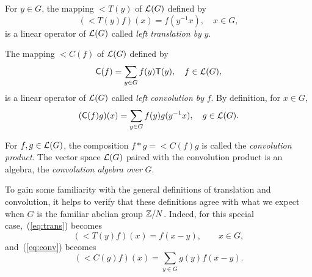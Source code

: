 
For 
$y\in G$, 
the mapping 
$\lt{T}(y)$ 
of 
$\mathcal{L}(G)$ 
defined 
by 
\begin{equation}\label{eq:trans}
(\lt{T}(y)f)(x) = f(y^{-1}x), \quad x \in G,
\end{equation}
is a linear operator of $\mathcal{L}(G)$ called 
\emph{left translation by} $y$.

The mapping $\lt{C}(f)$ of $\mathcal{L}(G)$ defined by 
\begin{equation}
\mathsf{C}(f) = \sum_{y\in G} f(y) \mathsf{T}(y), \quad f\in \mathcal{L}(G),
\end{equation}
is a linear operator of $\mathcal{L}(G)$ called 
\emph{left convolution by} $f$.  By definition, for $x\in G$,
\begin{equation}\label{eq:conv}
(\mathsf{C}(f)g)(x) = \sum_{y\in G} f(y) g(y^{-1}x), \quad g \in \mathcal{L}(G).
\end{equation}

For $f, g \in \mathcal{L}(G)$, the composition
$f * g  = \lt{C}(f)g$
is called the \emph{convolution product}.
The vector space $\mathcal{L}(G)$ paired with the convolution product
is an algebra, the \emph{convolution algebra over} $G$.
\begin{example}
To gain some familiarity with the general 
definitions of translation %
and convolution, %
it helps to verify 
that these definitions agree with what we expect 
when $G$ is the familiar abelian group $\mathbb{Z}/N$. 
Indeed, for this special case,~(\ref{eq:trans}) becomes
\begin{equation}
(\lt{T}(y)f)(x) = f(x-y),  \qquad x \in G,
\end{equation}
and~(\ref{eq:conv}) becomes
\begin{equation}
(\lt{C}(g)f)(x) =\sum_{y \in G} g(y)f(x-y).
\end{equation}
\end{example}

